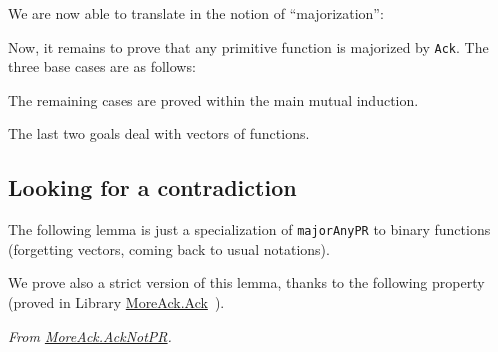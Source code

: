 




We are now able to translate in \gallina{} the notion of ``majorization'':





Now, it remains to prove that any primitive function is majorized by \texttt{Ack}.
The three base cases  are as follows:









The remaining cases are proved within the main  mutual  induction.









The last two goals deal with vectors of functions.




\subsection{Looking for a contradiction}

The following lemma is just a specialization of \texttt{majorAnyPR} to
binary functions (forgetting vectors, coming back to usual notations).



We prove also a strict version of this lemma, thanks to the following property (proved in Library
\href{../theories/html/hydras.MoreAck.Ack.html}{MoreAck.Ack}~).




\vspace{4pt}
\noindent
\emph{From \href{../theories/html/hydras.MoreAck.AckNotPR.html}{MoreAck.AckNotPR}.}







